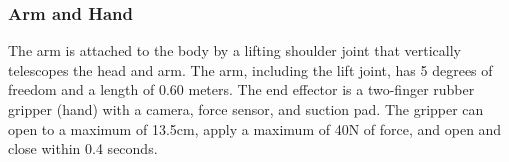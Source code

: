 \documentclass[12pt]{article}
\begin{document}
        \subsubsection{Arm and Hand}
            The arm is attached to the body by a lifting shoulder joint that vertically telescopes the head and arm. The arm, including the lift joint, has 5 degrees of freedom and a length of 0.60 meters. The end effector is a two-finger rubber gripper (hand) with a camera, force sensor, and suction pad. The gripper can open to a maximum of 13.5cm, apply a maximum of 40N of force, and open and close within 0.4 seconds.

\end{document}
